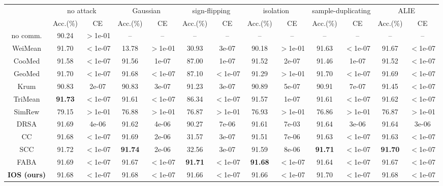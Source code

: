 \begin{tabular}{c|cc|cc|cc|cc|cc|cc}
\hline\hline
\multirow{2}{*}{}&\multicolumn{2}{c|}{no attack}&\multicolumn{2}{c|}{Gaussian}&\multicolumn{2}{c|}{sign-flipping}&\multicolumn{2}{c|}{isolation}&\multicolumn{2}{c|}{sample-duplicating}&\multicolumn{2}{c}{ALIE}\\
& Acc.(\%) & CE & Acc.(\%) & CE & Acc.(\%) & CE & Acc.(\%) & CE & Acc.(\%) & CE & Acc.(\%) & CE \\
\hline
no comm. & 90.24 & $>$1e-01 & -- & --  & -- & --  & -- & --  & -- & --  & -- & -- \\
\hline
WeiMean & {91.70} & {$<$1e-07} & {13.78} & {$>$1e-01} & {30.93} & {3e-07} & {90.18} & {$>$1e-01} & {91.63} & {$<$1e-07} & {91.67} & {$<$1e-07}\\
CooMed & {91.58} & {$<$1e-07} & {91.56} & {1e-07} & {87.00} & {1e-07} & {91.52} & {2e-07} & {91.46} & {1e-07} & {91.52} & {$<$1e-07}\\
GeoMed & {91.70} & {$<$1e-07} & {91.68} & {$<$1e-07} & {87.10} & {$<$1e-07} & {91.29} & {$>$1e-01} & {91.70} & {$<$1e-07} & {91.69} & {$<$1e-07}\\
Krum & {90.83} & {2e-07} & {90.83} & {3e-07} & {91.23} & {3e-07} & {90.89} & {5e-07} & {90.91} & {7e-07} & {91.45} & {$<$1e-07}\\
TriMean & \textbf{91.73} & {$<$1e-07} & {91.61} & {$<$1e-07} & {86.34} & {$<$1e-07} & {91.57} & {1e-07} & {91.61} & {$<$1e-07} & {91.62} & {$<$1e-07}\\
SimRew & {79.15} & {$>$1e-01} & {76.88} & {$>$1e-01} & {76.87} & {$>$1e-01} & {76.93} & {$>$1e-01} & {76.86} & {$>$1e-01} & {76.87} & {$>$1e-01}\\
DRSA & {91.69} & {4e-06} & {91.62} & {4e-06} & {90.27} & {7e-06} & {91.61} & {7e-03} & {91.64} & {3e-06} & {91.64} & {3e-06}\\
CC & {91.68} & {$<$1e-07} & {91.69} & {2e-06} & {31.57} & {3e-07} & {91.51} & {7e-06} & {91.63} & {$<$1e-07} & {91.63} & {$<$1e-07}\\
SCC & {91.72} & {$<$1e-07} & \textbf{91.74} & {2e-06} & {32.56} & {3e-07} & {91.59} & {8e-06} & \textbf{91.71} & {$<$1e-07} & \textbf{91.70} & {$<$1e-07}\\
FABA & {91.69} & {$<$1e-07} & {91.67} & {$<$1e-07} & \textbf{91.71} & {$<$1e-07} & \textbf{91.68} & {$<$1e-07} & {91.64} & {$<$1e-07} & {91.67} & {$<$1e-07}\\
\textbf{IOS (ours)} & {91.68} & {$<$1e-07} & {91.68} & {$<$1e-07} & {91.66} & {$<$1e-07} & {91.66} & {$<$1e-07} & {91.70} & {$<$1e-07} & {91.68} & {$<$1e-07}\\
\hline\hline
\end{tabular}
